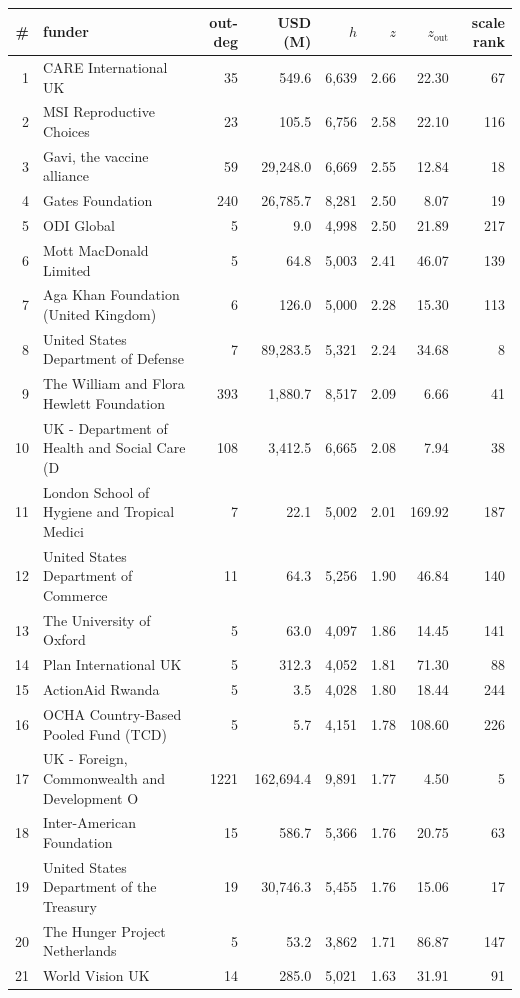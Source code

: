 \begin{tabular}{rlrrrrrr}
\toprule
\# & funder & out-deg & USD (M) & $h$ & $z$ & $z_{\mathrm{out}}$ & scale rank\\
\midrule
1 & CARE International UK & 35 & 549.6 & 6,639 & 2.66 & 22.30 & 67\\
2 & MSI Reproductive Choices & 23 & 105.5 & 6,756 & 2.58 & 22.10 & 116\\
3 & Gavi, the vaccine alliance & 59 & 29,248.0 & 6,669 & 2.55 & 12.84 & 18\\
4 & Gates Foundation & 240 & 26,785.7 & 8,281 & 2.50 & 8.07 & 19\\
5 & ODI Global & 5 & 9.0 & 4,998 & 2.50 & 21.89 & 217\\
6 & Mott MacDonald Limited & 5 & 64.8 & 5,003 & 2.41 & 46.07 & 139\\
7 & Aga Khan Foundation (United Kingdom) & 6 & 126.0 & 5,000 & 2.28 & 15.30 & 113\\
8 & United States Department of Defense & 7 & 89,283.5 & 5,321 & 2.24 & 34.68 & 8\\
9 & The William and Flora Hewlett Foundation & 393 & 1,880.7 & 8,517 & 2.09 & 6.66 & 41\\
10 & UK - Department of Health and Social Care (D & 108 & 3,412.5 & 6,665 & 2.08 & 7.94 & 38\\
11 & London School of Hygiene and Tropical Medici & 7 & 22.1 & 5,002 & 2.01 & 169.92 & 187\\
12 & United States Department of Commerce & 11 & 64.3 & 5,256 & 1.90 & 46.84 & 140\\
13 & The University of Oxford & 5 & 63.0 & 4,097 & 1.86 & 14.45 & 141\\
14 & Plan International UK & 5 & 312.3 & 4,052 & 1.81 & 71.30 & 88\\
15 & ActionAid Rwanda & 5 & 3.5 & 4,028 & 1.80 & 18.44 & 244\\
16 & OCHA Country-Based Pooled Fund (TCD) & 5 & 5.7 & 4,151 & 1.78 & 108.60 & 226\\
17 & UK - Foreign, Commonwealth and Development O & 1221 & 162,694.4 & 9,891 & 1.77 & 4.50 & 5\\
18 & Inter-American Foundation & 15 & 586.7 & 5,366 & 1.76 & 20.75 & 63\\
19 & United States Department of the Treasury & 19 & 30,746.3 & 5,455 & 1.76 & 15.06 & 17\\
20 & The Hunger Project Netherlands & 5 & 53.2 & 3,862 & 1.71 & 86.87 & 147\\
21 & World Vision UK & 14 & 285.0 & 5,021 & 1.63 & 31.91 & 91\\

\end{tabular}
